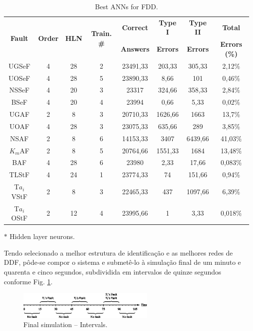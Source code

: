 \documentclass[10pt,fleqn,a4paper]{article}
\begin{document}
\begin{table}[htb]
\centering
\caption{Best ANNs for FDD.}
\label{tab:best_ann}
\begin{threeparttable}
\begin{tabular}{|c|c|c|c|c|c|c|c|}
\hline
\multirow{2}{*}{\bf Fault} &
\multirow{2}{*}{\bf Order} &
\multirow{2}{*}{{\bf HLN}\tnote{$*$}} &
\multirow{2}{*}{\bf Train. \#} &
{\bf Correct} & {\bf Type I} & {\bf Type II} & {\bf Total}\\
& & & & {\bf Answers} & {\bf Errors} & {\bf Errors} & {\bf Errors (\%)}\\
\hline
UGSeF & 4 & 28 & 2 & 23491,33 & 203,33 & 305,33 & 2,12\%\\
\hline
UOSeF & 4 & 28 & 5 & 23890,33 & 8,66 & 101 & 0,46\%\\
\hline
NSSeF & 4 & 20 & 3 & 23317 & 324,66 & 358,33 & 2,84\%\\
\hline
BSeF & 4 & 20 & 4 & 23994 & 0,66 & 5,33 & 0,02\%\\
\hline
UGAF & 2 & 8 & 3 & 20710,33 & 1626,66 & 1663 & 13,7\%\\
\hline
UOAF & 4 & 28 & 3 & 23075,33 & 635,66 & 289 & 3,85\%\\
\hline
{NSAF} & 2 & 8 & 6 & 14153,33 & 3407 & 6439,66 & 41,03\%\\
\hline
$K_m$AF & 2 & 8 & 5 & 20764,66 & 1551,33 & 1684 & 13,48\%\\
\hline
BAF & 4 & 28 & 6 & 23980 & 2,33 & 17,66 & 0,083\%\\
\hline
TLStF & 4 & 24 & 1 & 23774,33 & 74 & 151,66 & 0,94\%\\
\hline
T$a_i$VStF & 2 & 8 & 3 & 22465,33 & 437 & 1097,66 & 6,39\%\\
\hline
T$a_i$OStF & 2 & 12 & 4 & 23995,66 & 1 & 3,33 & 0,018\%\\
\hline
\end{tabular}
\begin{tablenotes}
\item [$*$] Hidden layer neurons.
\end{tablenotes}
\end{threeparttable}
\end{table}

Tendo selecionado a melhor estrutura de identificação e as melhores redes de
DDF, pôde-se compor o sistema e submetê-lo à simulação final de um minuto
e quarenta e cinco segundos, subdividida em intervalos de quinze segundos
conforme Fig. \ref{fig:intervals}.

\begin{figure}[htb]
\centering
    \includegraphics[width=0.6\textwidth]{imgs/intervals}
    \caption{Final simulation -- Intervals.}
    \label{fig:intervals}
\end{figure}
\end{document}
